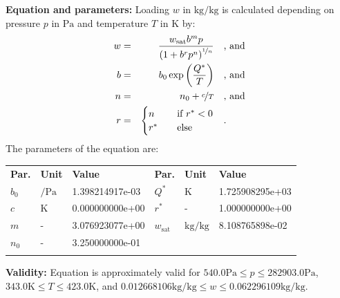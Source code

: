 \textbf{Equation and parameters:}
\newline
%
Loading $w$ in $\si{\kilogram\per\kilogram}$ is calculated depending on pressure $p$ in $\si{\pascal}$ and temperature $T$ in $\si{\kelvin}$ by:
%
\begin{equation*}
\begin{split}
w &=& \frac{w_\mathrm{sat} b^{m} p}{\left( 1 + b^{r} p^{n} \right)^{\nicefrac{1}{n}}} & \quad\text{, and} \\
b &=& b_0 \exp\left( \frac{Q^{*}}{T} \right) & \quad\text{, and} \\
n &=& n_0 + \nicefrac{c}{T} & \quad\text{, and} \\
r &=& \begin{cases} n & \quad \text{if } r^{*} < 0 \\ r^{*}  & \quad \text{else} \end{cases} & \quad\text{.}
\end{split}
\end{equation*}
%
The parameters of the equation are:
%
\begin{longtable}[l]{lll|lll}
\toprule
\addlinespace
\textbf{Par.} & \textbf{Unit} & \textbf{Value} &	\textbf{Par.} & \textbf{Unit} & \textbf{Value} \\
\addlinespace
\midrule
\endhead

\bottomrule
\endfoot
\bottomrule
\endlastfoot
\addlinespace

$b_0$ & $\si{\per\pascal}$ & 1.398214917e-03 & $Q^{*}$ & $\si{\kelvin}$ & 1.725908295e+03 \\
$c$ & $\si{\kelvin}$ & 0.000000000e+00 & $r^{*}$ & - & 1.000000000e+00 \\
$m$ & - & 3.076923077e+00 & $w_\mathrm{sat}$ & $\si{\kilogram\per\kilogram}$ & 8.108765898e-02 \\
$n_0$ & - & 3.250000000e-01 & & & \\

\addlinespace\end{longtable}

\textbf{Validity:}
\newline
Equation is approximately valid for $540.0 \si{\pascal} \leq p \leq 282903.0 \si{\pascal}$,  $343.0 \si{\kelvin} \leq T \leq 423.0 \si{\kelvin}$, and $0.012668106 \si{\kilogram\per\kilogram} \leq w \leq 0.062296109 \si{\kilogram\per\kilogram}$.
\newline

